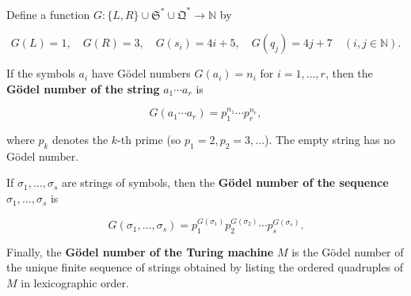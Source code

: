 Define a function $G: \{L, R\} \cup \mathfrak{S}^* \cup \mathfrak{Q}^* \to \mathbb{N}$ by

$$G(L) = 1, \quad G(R) = 3, \quad G(s_i) = 4i + 5, \quad G(q_j) = 4j + 7 \quad (i, j \in \mathbb{N}).$$

If the symbols $a_i$ have Gödel numbers $G(a_i) = n_i$ for $i = 1, \ldots, r$, then the \textbf{Gödel number of the string} $a_1 \cdots a_r$ is

$$G(a_1 \cdots a_r) = p_1^{n_1} \cdots p_r^{n_r},$$

where $p_k$ denotes the $k$-th prime (so $p_1 = 2, p_2 = 3, \ldots$). The empty string has no Gödel number.

If $\sigma_1, \ldots, \sigma_s$ are strings of symbols, then the \textbf{Gödel number of the sequence} $\sigma_1, \ldots, \sigma_s$ is

$$G(\sigma_1, \ldots, \sigma_s) = p_1^{G(\sigma_1)} p_2^{G(\sigma_2)} \cdots p_s^{G(\sigma_s)}.$$

Finally, the \textbf{Gödel number of the Turing machine} $M$ is the Gödel number of the unique finite sequence of strings obtained by listing the ordered quadruples of $M$ in lexicographic order.
